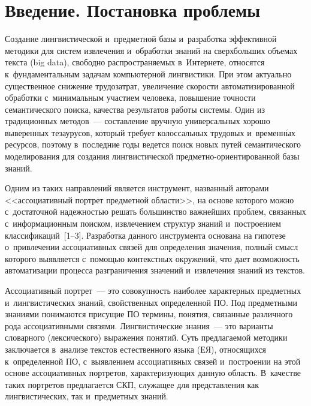 
\vspace*{-10pt}




\thispagestyle{headings}

\begin{multicols}{2}

\label{st\stat}


    \section{Введение. Постановка проблемы}

     Создание лингвистической и~предметной базы и~разработка
эффективной методики для систем извлечения и~обработки знаний на
сверхбольших объемах текста (big data), свободно распространяемых в~Интернете, относятся к~фундаментальным задачам компьютерной
лингвистики. При этом актуально существенное снижение трудозатрат,
увеличение скорости автоматизированной обработки с~минимальным
участием человека, повышение точности семантического поиска, качества
результатов работы системы. Один из традиционных методов~---
составление вручную универсальных хорошо выверенных тезаурусов,
который требует колоссальных трудовых и~временн$\acute{\mbox{ы}}$х ресурсов, поэтому в~последние годы ведется поиск новых путей семантического моделирования
для создания лингвистической предметно-ориентированной базы знаний.

Одним из таких направлений является инструмент, названный авторами
<<ассоциативный портрет предметной области>>, на основе
которого можно с~достаточной надежностью решать большинство
важнейших проблем, связанных с~информационным поиском, извлечением
структур знаний и~построением классификаций~[1--3]. Разработка данного
инструмента основана на гипотезе о~привлечении ассоциативных связей для
определения значения, полный смысл которого выявляется с~помощью
контекстных окружений, что дает возможность автоматизации процесса
разграничения значений и~извлечения знаний из текстов.

     Ассоциативный портрет~--- это совокупность наиболее характерных
предметных и~лингвистических знаний, свойственных определенной
ПО. Под предметными знаниями понимаются
присущие ПО термины, понятия, связанные различного рода
ассоциативными связями. Лингвистические знания~--- это варианты
словарного (лексического) выражения понятий. Суть предлагаемой методики
заключается в~анализе текстов естественного языка (ЕЯ), относящихся к~определенной ПО, с~выяв\-лением ассоциативных связей и~построении на этой основе ассоциативных портретов, характери\-зу\-ющих
данную область. В~качестве таких портретов предлагается
СКП, служащее для представления как
лингвистических, так и~предметных \mbox{знаний}.


\end{multicols}
